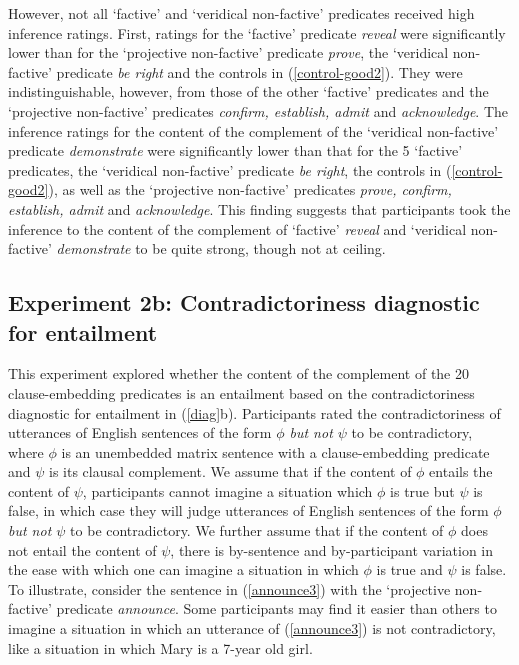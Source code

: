 \documentclass[11pt,fleqn]{article}
\newcommand{\6}{\mbox{$[\hspace*{-.6mm}[$}}
\newcommand{\9}{\mbox{$]\hspace*{-.6mm}]$}}
\begin{document}
However, not all `factive' and `veridical non-factive' predicates received high inference ratings. First, ratings for the `factive' predicate {\em reveal} were significantly lower than for the `projective non-factive' predicate {\em prove}, the `veridical non-factive' predicate {\em be right} and the controls in (\ref{control-good2}). They were indistinguishable, however, from those of the other `factive' predicates and the `projective non-factive' predicates {\em confirm, establish, admit} and {\em acknowledge}.  The inference ratings for the content of the complement of the `veridical non-factive' predicate {\em demonstrate} were significantly lower than that for the 5 `factive' predicates, the `veridical non-factive' predicate {\em be right}, the controls in (\ref{control-good2}), as well as the `projective non-factive' predicates {\em prove, confirm, establish, admit} and {\em acknowledge}. This finding suggests that participants took the inference to the content of the complement of `factive' {\em reveal} and `veridical non-factive' {\em demonstrate} to be quite strong, though not at ceiling.  

\subsection{Experiment 2b: Contradictoriness diagnostic for entailment}\label{s32}

This experiment explored whether the content of the complement of the 20 clause-embedding predicates is an entailment based on the contradictoriness diagnostic for entailment in (\ref{diag}b). Participants rated the contradictoriness of utterances of English sentences of the form {\em $\phi$ but not $\psi$}  to be contradictory, where $\phi$ is an unembedded matrix sentence with a clause-embedding predicate and $\psi$ is its clausal complement. We assume that if the content of $\phi$ entails the content of $\psi$, participants cannot imagine a situation which $\phi$ is true but $\psi$ is false, in which case they will judge utterances of English sentences of the form {\em $\phi$ but not $\psi$}  to be contradictory. We further assume that if the content of $\phi$ does not entail the content of $\psi$, there is by-sentence and by-participant variation in the ease with which one can imagine a situation in which $\phi$ is true and $\psi$ is false. To illustrate, consider the sentence in (\ref{announce3}) with the `projective non-factive' predicate {\em announce}. Some participants may find it easier than others to imagine a situation in which an utterance of (\ref{announce3}) is not contradictory, like a situation in which Mary is a 7-year old girl. 
\end{document}
